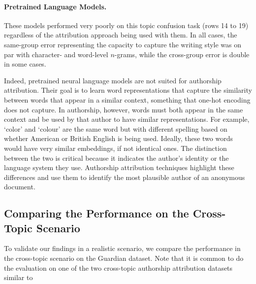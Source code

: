 \documentclass[11pt]{article}
\begin{document}
\paragraph{Pretrained Language Models.} These models performed very poorly on this topic confusion task (rows 14 to 19) regardless of the attribution approach being used with them. In all cases, the same-group error representing the capacity to capture the writing style was on par with character- and word-level $n$-grams, while the cross-group error is double in some cases. 

Indeed, pretrained neural language models are not suited for authorship attribution. Their goal is to learn word representations that capture the similarity between words that appear in a similar context, something that one-hot encoding does not capture. In authorship, however, words must both appear in the same context and be used by that author to have similar representations. For example, `color' and `colour' are the same word but with different spelling based on whether American or British English is being used. Ideally, these two words would have very similar embeddings, if not identical ones. The distinction between the two is critical because it indicates the author's identity or the language system they use. Authorship attribution techniques highlight these differences and use them to identify the most plausible author of an anonymous document. 

\subsection{Comparing the Performance on the Cross-Topic Scenario}
To validate our findings in a realistic scenario, we compare the performance in the cross-topic scenario on the Guardian dataset. Note that it is common to do the evaluation on one of the two cross-topic authorship attribution datasets~\citep{goldstein2009person,Stamatatos.E:2013} similar to~ \citep{goldstein2009person,Sapkota.U:2014,Stamatatos.E:2017, stamatatos2018masking,Barlas2020,Barlas2021}

\end{document}
